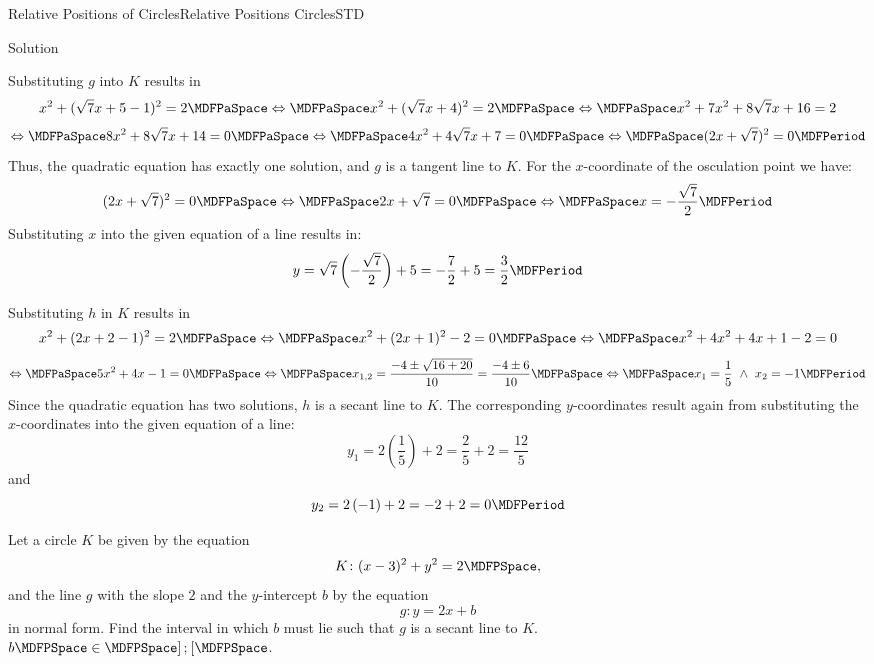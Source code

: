 \begin{MXContent}{Relative Positions of Circles}{Relative Positions Circles}{STD}
\begin{MExercise}
\begin{MHint}{Solution}
\begin{MExerciseItems}
\item{Substituting $g$ into $K$ results in
\[
 x^2+(\sqrt{7}x+5-1)^2=2\MDFPaSpace\Leftrightarrow\MDFPaSpace x^2+(\sqrt{7}x+4)^2=2\MDFPaSpace\Leftrightarrow\MDFPaSpace x^2+7x^2+8\sqrt{7}x+16=2
\]
\[
 \Leftrightarrow\MDFPaSpace 8x^2+8\sqrt{7}x+14=0\MDFPaSpace\Leftrightarrow\MDFPaSpace 4x^2+4\sqrt{7}x+7=0\MDFPaSpace\Leftrightarrow\MDFPaSpace (2x+\sqrt{7})^2=0 \MDFPeriod
\]
Thus, the quadratic equation has exactly one solution, and $g$ is a tangent line to $K$. For the $x$-coordinate of the 
osculation point we have:
\[
 (2x+\sqrt{7})^2=0\MDFPaSpace\Leftrightarrow\MDFPaSpace 2x+\sqrt{7}=0\MDFPaSpace\Leftrightarrow\MDFPaSpace x=-\frac{\sqrt{7}}{2}\MDFPeriod
\]
Substituting $x$ into the given equation of a line results in:
\[
 y=\sqrt{7}\left(-\frac{\sqrt{7}}{2}\right)+5=-\frac{7}{2}+5=\frac{3}{2}\MDFPeriod
\]
}
\item{Substituting $h$ in $K$ results in
\[
 x^2+(2x+2-1)^2=2\MDFPaSpace\Leftrightarrow\MDFPaSpace x^2+(2x+1)^2-2=0\MDFPaSpace\Leftrightarrow\MDFPaSpace x^2+4x^2+4x+1-2=0
\]
\[
 \Leftrightarrow\MDFPaSpace 5x^2+4x-1=0\MDFPaSpace\Leftrightarrow\MDFPaSpace x_{1,2}=\frac{-4\pm\sqrt{16+20}}{10}=\frac{-4\pm 6}{10}\MDFPaSpace\Leftrightarrow\MDFPaSpace
 x_1=\frac{1}{5}\ \wedge\ x_2=-1 \MDFPeriod
\]
Since the quadratic equation has two solutions, $h$ is a secant line to $K$. The corresponding $y$-coordinates result 
again from substituting the $x$-coordinates into the given equation of a line:
\[
 y_1=2\left(\frac{1}{5}\right)+2=\frac{2}{5}+2=\frac{12}{5}
\]
and 
\[
 y_2=2\left(-1\right)+2=-2+2=0\MDFPeriod
\]

}
\end{MExerciseItems}
 
\end{MHint}

\end{MExercise}


\begin{MExercise}
Let a circle $K$ be given by the equation
\[
 K\colon (x-3)^2+y^2=2 \MDFPSpace ,
\]
and the line $g$ with the slope $2$ and the $y$-intercept $b$ by the equation
\[
 g\colon y=2x+b
\]
in normal form. Find the interval in which $b$ must lie such that $g$ is a secant line to $K$.\\
$b\MDFPSpace \in \MDFPSpace ]$$;$$[ \MDFPSpace$.


\end{MExercise}
\end{MXContent}
